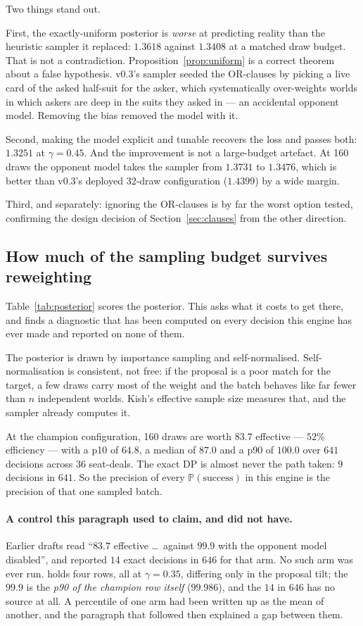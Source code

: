 \documentclass[11pt,a4paper]{article}
\newcommand{\Prob}{\ensuremath{\mathbb{P}}}
\begin{document}
Two things stand out.

First, the exactly-uniform posterior is \emph{worse} at predicting reality than
the heuristic sampler it replaced: $1.3618$ against $1.3408$ at a matched draw
budget. That is not a contradiction. Proposition~\ref{prop:uniform} is a correct
theorem about a false hypothesis. v0.3's sampler seeded the OR-clauses by
picking a live card of the asked half-suit for the asker, which systematically
over-weights worlds in which askers are deep in the suits they asked in --- an
accidental opponent model. Removing the bias removed the model with it.

Second, making the model explicit and tunable recovers the loss and passes both:
$1.3251$ at $\gamma = 0.45$. And the improvement is not a large-budget artefact.
At 160 draws the opponent model takes the sampler from $1.3731$ to $1.3476$,
which is better than v0.3's deployed 32-draw configuration ($1.4399$) by a wide
margin.

Third, and separately: ignoring the OR-clauses is by far the worst option
tested, confirming the design decision of Section~\ref{sec:clauses} from the
other direction.

\subsection{How much of the sampling budget survives reweighting}
\label{sec:res-ess}

Table~\ref{tab:posterior} scores the posterior. This asks what it costs to get
there, and finds a diagnostic that has been computed on every decision this
engine has ever made and reported on none of them.

The posterior is drawn by importance sampling and self-normalised.
Self-normalisation is consistent, not free: if the proposal is a poor match for
the target, a few draws carry most of the weight and the batch behaves like far
fewer than $n$ independent worlds. Kish's effective sample size measures that,
and the sampler already computes it.

At the champion configuration, 160 draws are worth $83.7$ effective --- $52\%$
efficiency --- with a p10 of $64.8$, a median of $87.0$ and a p90 of $100.0$
over $641$ decisions across $36$ seat-deals. The exact DP is almost never the
path taken: $9$ decisions in $641$. So the precision of every
$\Prob(\text{success})$ in this engine is the precision of that one sampled
batch.

\paragraph{A control this paragraph used to claim, and did not have.} Earlier
drafts read ``$83.7$ effective \dots\ against $99.9$ with the opponent model
disabled'', and reported $14$ exact decisions in $646$ for that arm. No such arm
was ever run.  holds four rows, all at
$\gamma = 0.35$, differing only in the proposal tilt; the $99.9$ is the
\emph{p90 of the champion row itself} ($99.986$), and the $14$ in $646$ has no
source at all. A percentile of one arm had been written up as the mean of
another, and the paragraph that followed then explained a gap between them.
\end{document}
